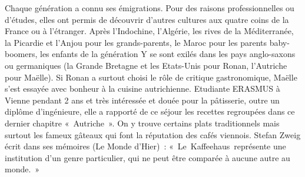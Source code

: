 Chaque génération a connu ses émigrations. Pour des raisons professionnelles ou d’études, elles ont permis de découvrir d’autres cultures aux quatre coins de la France ou à l’étranger. Après l’Indochine, l’Algérie, les rives de la Méditerranée, la Picardie et l’Anjou pour les grands-parents, le Maroc pour les parents baby-boomers, les enfants de la génération Y se sont exilés dans les pays anglo-saxons ou germaniques (la Grande Bretagne et les Etats-Unis pour Ronan, l’Autriche pour Maëlle).
Si Ronan a surtout choisi le rôle de critique gastronomique, Maëlle s’est essayée avec bonheur à la cuisine autrichienne. Etudiante ERASMUS à Vienne pendant 2 ans et très intéressée et douée pour la pâtisserie, outre un diplôme d’ingénieure, elle a rapporté de ce séjour les recettes regroupées dans ce dernier chapitre « Autriche ». On y trouve certains plats traditionnels mais surtout les fameux gâteaux qui font la réputation des cafés viennois. Stefan Zweig écrit dans ses mémoires (Le Monde d’Hier) : « Le Kaffeehaus représente une institution d'un genre particulier, qui ne peut être comparée à aucune autre au monde. »

